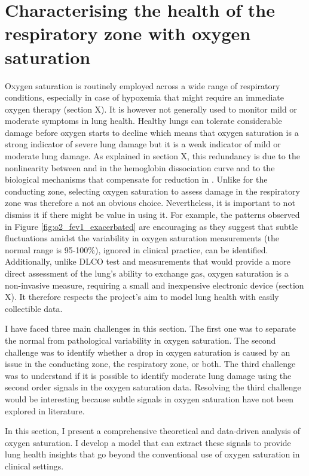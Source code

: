 \section{Characterising the health of the respiratory zone with oxygen saturation}

Oxygen saturation is routinely employed across a wide range of respiratory conditions, especially in case of hypoxemia that might require an immediate oxygen therapy (section X). It is however not generally used to monitor mild or moderate symptoms in lung health. Healthy lungs can tolerate considerable damage before oxygen starts to decline which means that oxygen saturation is a strong indicator of severe lung damage but it is a weak indicator of mild or moderate lung damage. As explained in section X, this redundancy is due to the nonlinearity between \PA and \SP in the hemoglobin dissociation curve and to the biological mechanisms that compensate for reduction in \PA. Unlike \F for the conducting zone, selecting oxygen saturation to assess damage in the respiratory zone was therefore a not an obvious choice. Nevertheless, it is important to not dismiss it if there might be value in using it.  For example, the patterns observed in Figure \ref{fig:o2_fev1_exacerbated} are encouraging as they suggest that subtle fluctuations amidst the variability in oxygen saturation measurements (the normal range is 95-100\%), ignored in clinical practice, can be identified. Additionally, unlike DLCO test and \PA measurements that would provide a more direct assessment of the lung's ability to exchange gas, oxygen saturation is a non-invasive measure, requiring a small and inexpensive electronic device (section X). It therefore respects the project's aim to model lung health with easily collectible data.

I have faced three main challenges in this section. The first one was to separate the normal from pathological variability in oxygen saturation. The second challenge was to identify whether a drop in oxygen saturation is caused by an issue in the conducting zone, the respiratory zone, or both. The third challenge was to understand if it is possible to identify moderate lung damage using the second order signals in the oxygen saturation data. Resolving the third challenge would be interesting because subtle signals in oxygen saturation have not been explored in literature.

In this section, I present a comprehensive theoretical and data-driven analysis of oxygen saturation. I develop a model that can extract these signals to provide lung health insights  that go beyond the conventional use of oxygen saturation in clinical settings.

